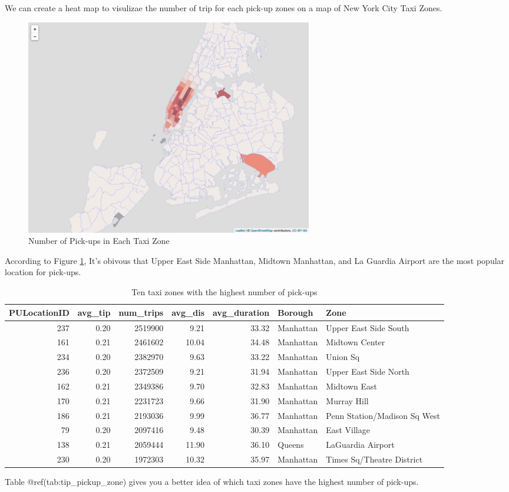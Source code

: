 \documentclass[12pt,twoside]{reedthesis}
\theoremstyle{definition}
\theoremstyle{definition}
\theoremstyle{definition}
\theoremstyle{remark}
\begin{document}
We can create a heat map to visulizae the number of trip for each
pick-up zones on a map of New York City Taxi Zones.
\begin{figure}

{\centering \includegraphics[width=4.96in]{figure/num_trip} 

}

\caption{Number of Pick-ups in Each Taxi Zone}\label{fig:num-trip}
\end{figure}
According to Figure \ref{fig:num-trip}, It's obivous that Upper East
Side Manhattan, Midtown Manhattan, and La Guardia Airport are the most
popular location for pick-ups.
\begin{table}

\caption{\label{tab:unnamed-chunk-32}Ten taxi zones with the highest number of pick-ups}
\centering
\begin{tabular}[t]{r|r|r|r|r|l|l}
\hline
PULocationID & avg\_tip & num\_trips & avg\_dis & avg\_duration & Borough & Zone\\
\hline
237 & 0.20 & 2519900 & 9.21 & 33.32 & Manhattan & Upper East Side South\\
\hline
161 & 0.21 & 2461602 & 10.04 & 34.48 & Manhattan & Midtown Center\\
\hline
234 & 0.20 & 2382970 & 9.63 & 33.22 & Manhattan & Union Sq\\
\hline
236 & 0.20 & 2372509 & 9.21 & 31.94 & Manhattan & Upper East Side North\\
\hline
162 & 0.21 & 2349386 & 9.70 & 32.83 & Manhattan & Midtown East\\
\hline
170 & 0.21 & 2231723 & 9.66 & 31.90 & Manhattan & Murray Hill\\
\hline
186 & 0.21 & 2193036 & 9.99 & 36.77 & Manhattan & Penn Station/Madison Sq West\\
\hline
79 & 0.20 & 2097416 & 9.48 & 30.39 & Manhattan & East Village\\
\hline
138 & 0.21 & 2059444 & 11.90 & 36.10 & Queens & LaGuardia Airport\\
\hline
230 & 0.20 & 1972303 & 10.32 & 35.97 & Manhattan & Times Sq/Theatre District\\
\hline
\end{tabular}
\end{table}
Table @ref(tab:tip\_pickup\_zone) gives you a better idea of which taxi
zones have the highest number of pick-ups.
\end{document}
